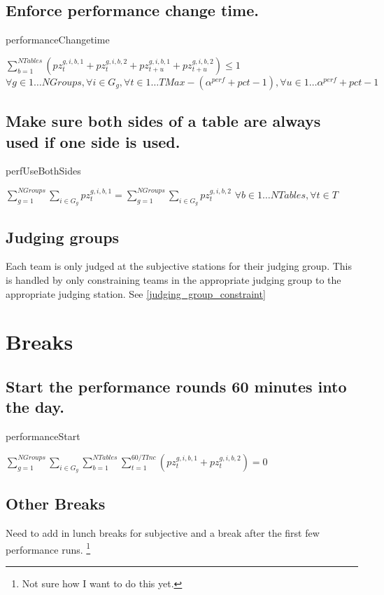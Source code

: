 \documentclass[letterpaper,11pt]{report}
\newcommand{\doccomment}[3]%
{\marginpar{\textcolor{#2}{\bf #1}}%
\footnote{{\color{#2}#3}}%
}
\newcommand{\doccomment}[3]{}
\newcommand{\jpscomment}[1]%
{\doccomment{SCHEWE}{Bittersweet}{#1}}
\begin{document}
\FloatBarrier
\subsection{Enforce performance change time.}
\begin{algorithm}
\caption{performanceChangetime}
$
\sum\limits_{b=1}^{NTables} (
pz_{t}^{g,i,b,1} + pz_{t}^{g,i,b,2}
+
pz_{t+u}^{g,i,b,1} + pz_{t+u}^{g,i,b,2})
\le 1$
\hfill $
\forall g \in 1 \dots NGroups,
\forall i \in G_{g}, 
\forall t \in 1 \dots TMax - (\alpha^{perf} + pct - 1),
\forall u \in 1 \dots \alpha^{perf} + pct - 1$
\end{algorithm}

\FloatBarrier
\subsection{Make sure both sides of a table are always used if one side is
  used.}
\begin{algorithm}
\caption{perfUseBothSides}
$\sum\limits_{g=1}^{NGroups}\sum\limits_{i \in G_{g}} pz_{t}^{g,i,b,1} 
= 
\sum\limits_{g=1}^{NGroups}\sum\limits_{i \in G_{g}}pz_{t}^{g,i,b,2}$
\hfill $
\forall b \in 1 \dots NTables,
\forall t \in T$
\end{algorithm}


\FloatBarrier
\subsection{Judging groups}
Each team is only judged at the subjective stations for their judging
group. This is handled by only constraining teams in the appropriate
judging group to the appropriate judging station. See \autoref{judging_group_constraint}


\FloatBarrier
\section{Breaks}
\subsection{Start the performance rounds 60 minutes into the day.}
\begin{algorithm}
\caption{performanceStart}
$
\sum\limits_{g=1}^{NGroups}
\sum\limits_{i \in G_{g}} 
  \sum\limits_{b=1}^{NTables} 
    \sum\limits_{t = 1}^{60/TInc} 
      ( pz_{t}^{g,i,b,1} + pz_{t}^{g,i,b,2} ) = 0$
\end{algorithm}
    
\FloatBarrier
\subsection{Other Breaks}
Need to add in lunch breaks for subjective and a break after the first few
performance runs. \jpscomment{Not sure how I want to do this yet.}
\end{document}

